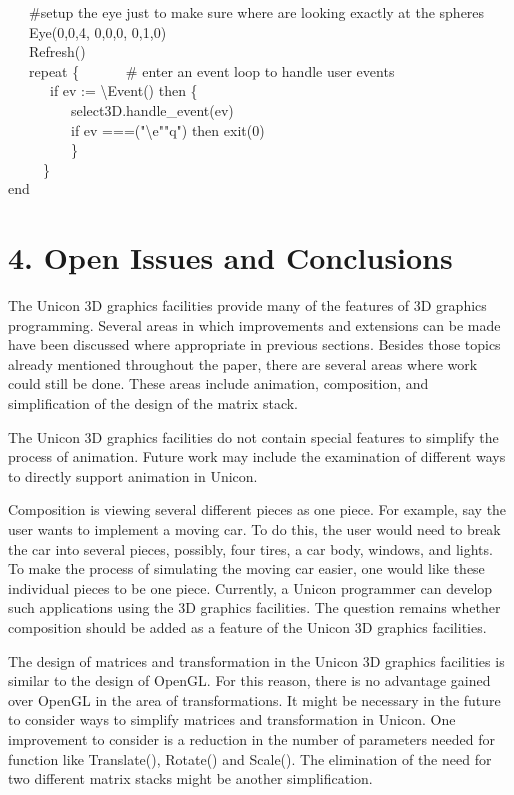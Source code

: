\documentclass[letterpaper]{article}
\begin{document}
{{\ \ \ \#setup the eye just to make sure where are looking exactly at the spheres \\
\ \ \ Eye(0,0,4, 0,0,0, 0,1,0) \\
\ \ \ Refresh() \\
\ \ \ repeat \{ \ \ \ \ \ \ \# enter an event loop to handle user events \\
\ \ \ \ \ \ if ev := {\textbackslash}Event() then \{ \\
\ \ \ \ \ \ \ \ \ select3D.handle\_event(ev) \\
\ \ \ \ \ \ \ \ \ if ev ===("{\textbackslash}e"{\textbar}"q") then
exit(0)\\
\ \ \ \ \ \ \ \ \ \} \\
 \ \ \ \ \ \}\\
end
}



\section[4. Open Issues and Conclusions]{4. Open Issues and Conclusions}


The Unicon 3D graphics facilities provide many of the features of 3D
graphics programming. Several areas in which improvements and
extensions can be made have been discussed where appropriate in
previous sections. Besides those topics already mentioned throughout
the paper, there are several areas where work could still be
done. These areas include animation, composition, and simplification
of the design of the matrix stack.

The Unicon 3D graphics facilities do not contain special features to
simplify the process of animation. Future work may include the
examination of different ways to directly support animation in Unicon.

Composition is viewing several different pieces as one piece. For
example, say the user wants to implement a moving car.  To do this,
the user would need to break the car into several pieces, possibly,
four tires, a car body, windows, and lights. To make the process of
simulating the moving car easier, one would like these individual
pieces to be one piece. Currently, a Unicon programmer can develop
such applications using the 3D graphics facilities. The question
remains whether composition should be added as a feature of the Unicon
3D graphics facilities.

The design of matrices and transformation in the Unicon 3D graphics
facilities is similar to the design of OpenGL. For this reason, there
is no advantage gained over OpenGL in the area of transformations. It
might be necessary in the future to consider ways to simplify matrices
and transformation in Unicon. One improvement to consider is a
reduction in the number of parameters needed for function like
\textsf{Translate()}, \textsf{Rotate()} and \textsf{Scale()}. The
elimination of the need for two different matrix stacks might be
another simplification.

}
\end{document}
